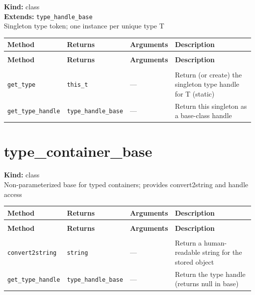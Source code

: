 \documentclass[11pt,letterpaper]{report}
\begin{document}
\noindent\textbf{Kind:} class\\
\noindent\textbf{Extends:} \texttt{type\_handle\_base}\\
\noindent Singleton type token; one instance per unique type T

\begin{xltabular}{\linewidth}{>{\small}p{1.35in} >{\small}p{1.25in} >{\small}p{0.95in} >{\small}X}
\toprule
\textbf{Method} & \textbf{Returns} & \textbf{Arguments} & \textbf{Description} \\
\midrule
\endfirsthead
{} \\
\midrule
\textbf{Method} & \textbf{Returns} & \textbf{Arguments} & \textbf{Description} \\
\midrule
\endhead
\midrule
{} \\
\endfoot
\bottomrule
\endlastfoot
\texttt{get\_type} & \texttt{this\_t} & --- & Return (or create) the singleton type handle for T (static) \\
\texttt{get\_type\_handle} & \texttt{type\_handle\_base} & --- & Return this singleton as a base-class handle \\
\end{xltabular}

\section{type\_container\_base}
\label{cls:typecontainerbase}

\noindent\textbf{Kind:} class\\
\noindent Non-parameterized base for typed containers; provides convert2string and handle access

\begin{xltabular}{\linewidth}{>{\small}p{1.35in} >{\small}p{1.25in} >{\small}p{0.95in} >{\small}X}
\toprule
\textbf{Method} & \textbf{Returns} & \textbf{Arguments} & \textbf{Description} \\
\midrule
\endfirsthead
{} \\
\midrule
\textbf{Method} & \textbf{Returns} & \textbf{Arguments} & \textbf{Description} \\
\midrule
\endhead
\midrule
{} \\
\endfoot
\bottomrule
\endlastfoot
\texttt{convert2string} & \texttt{string} & --- & Return a human-readable string for the stored object \\
\texttt{get\_type\_handle} & \texttt{type\_handle\_base} & --- & Return the type handle (returns null in base) \\
\end{xltabular}
\end{document}
